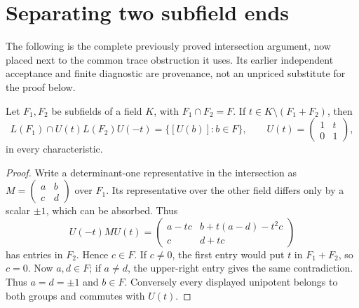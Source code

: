 \section{Separating two subfield ends}
The following is the complete previously proved intersection argument,
now placed next to the common trace obstruction it uses. Its earlier
independent acceptance and finite diagnostic are provenance, not an
unpriced substitute for the proof below.

\begin{lemma}\label{E.TranslatedSubfields}
Let $F_1,F_2$ be subfields of a field $K$, with $F_1\cap F_2=F$.
If $t\in K\setminus(F_1+F_2)$, then
\[
 L(F_1)\cap U(t)L(F_2)U(-t)
 =\{[U(b)]:b\in F\},\qquad U(t)=\begin{pmatrix}1&t\\0&1\end{pmatrix},
\]
in every characteristic.
\end{lemma}
\begin{proof}
Write a determinant-one representative in the intersection as
$M=\left(\begin{smallmatrix}a&b\\c&d\end{smallmatrix}\right)$ over $F_1$.
Its representative over the other field differs only by a scalar $\pm1$,
which can be absorbed. Thus
\[
 U(-t)MU(t)=\begin{pmatrix}
 a-tc&b+t(a-d)-t^2c\\c&d+tc
 \end{pmatrix}
\]
has entries in $F_2$. Hence $c\in F$. If $c\ne0$, the first entry
would put $t$ in $F_1+F_2$, so $c=0$. Now $a,d\in F$; if $a\ne d$,
the upper-right entry gives the same contradiction. Thus $a=d=\pm1$
and $b\in F$. Conversely every displayed unipotent belongs to both
groups and commutes with $U(t)$.
\end{proof}

